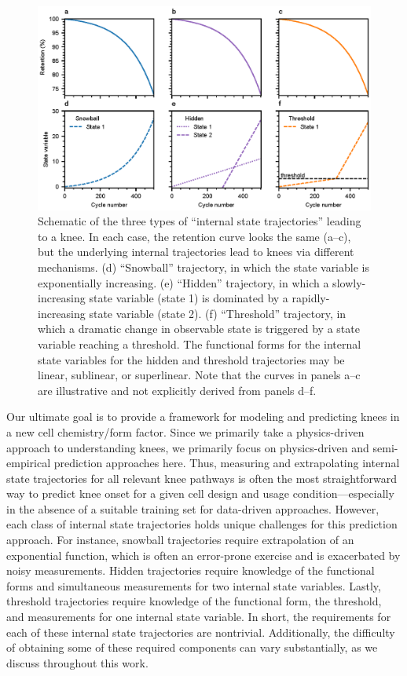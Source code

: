 \documentclass[journal=jpclcd,manuscript=article]{achemso}
\begin{document}
\begin{figure}[htp]
    \centering
    \includegraphics[scale=1]{figures/snowball_hidden_threshold.eps}
    \caption{Schematic of the three types of ``internal state trajectories'' leading to a knee. In each case, the retention curve looks the same (a--c), but the underlying internal trajectories lead to knees via different mechanisms. (d) ``Snowball'' trajectory, in which the state variable is exponentially increasing. (e) ``Hidden'' trajectory, in which a slowly-increasing state variable (state 1) is dominated by a rapidly-increasing state variable (state 2). (f) ``Threshold'' trajectory, in which a dramatic change in observable state is triggered by a state variable reaching a threshold.
    The functional forms for the internal state variables for the hidden and threshold trajectories may be linear, sublinear, or superlinear.
    Note that the curves in panels a--c are illustrative and not explicitly derived from panels d--f.
    }
    \label{fig:snowball_vs_hidden_vs_threshold}
\end{figure}

Our ultimate goal is to provide a framework for modeling and predicting knees in a new cell chemistry/form factor.
Since we primarily take a physics-driven approach to understanding knees, we primarily focus on physics-driven and semi-empirical prediction approaches here.
Thus, measuring and extrapolating internal state trajectories for all relevant knee pathways is often the most straightforward way to predict knee onset for a given cell design and usage condition---especially in the absence of a suitable training set for data-driven approaches.
However, each class of internal state trajectories holds unique challenges for this prediction approach.
For instance, snowball trajectories require extrapolation of an exponential function, which is often an error-prone exercise and is exacerbated by noisy measurements.
Hidden trajectories require knowledge of the functional forms and simultaneous measurements for two internal state variables.
Lastly, threshold trajectories require knowledge of the functional form, the threshold, and measurements for one internal state variable.
In short, the requirements for each of these internal state trajectories are nontrivial.
Additionally, the difficulty of obtaining some of these required components can vary substantially, as we discuss throughout this work.
\end{document}
